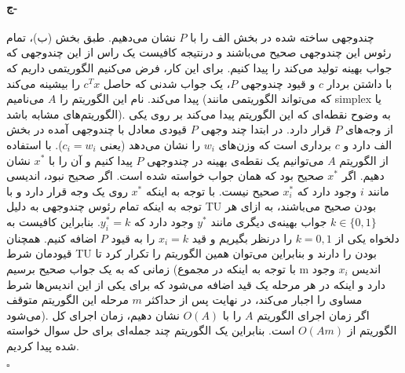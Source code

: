 \documentclass[a4paper,12pt]{article}
\begin{document}
\paragraph{ج-}
چندوجهی ساخته شده در بخش الف را با $P$ نشان می‌دهیم. طبق بخش  (ب)، تمام رئوس این چندوجهی صحیح می‌باشند و درنتیجه کافیست یک راس از این چندوجهی که جواب بهینه تولید می‌کند را پیدا کنیم. برای این کار، فرض می‌کنیم الگوریتمی داریم که با داشتن بردار $c$ و قیود چندوجهی $P$، یک جواب شدنی که حاصل
$c^Tx$
را بیشینه می‌کند پیدا می‌کند. نام این الگوریتم را $A$ می‌نامیم (که می‌تواند الگوریتمی مانند simplex یا الگوریتم‌های مشابه باشد). به وضوح نقطه‌ای که این الگوریتم پیدا می‌کند بر روی یکی از وجه‌های $P$ قرار دارد. در ابتدا چند وجهی $P$ قیودی معادل با چندوجهی آمده در بخش الف دارد و $c$ برداری است که وزن‌های $w_i$ را نشان می‌دهد (یعنی $c_i = w_i$).‌
با استفاده از الگوریتم $A$ می‌توانیم یک نقطه‌ی بهینه در چندوجهی $P$ پیدا کنیم و آن را با $x^*$ نشان دهیم. اگر $x^*$ صحیح بود که همان جواب خواسته شده‌ است. اگر صحیح نبود، اندیسی مانند $i$ وجود دارد که $x^*_i$ صحیح نیست. با توجه به اینکه $x^*$ روی یک وجه قرار دارد و با توجه به اینکه تمام رئوس چندوجهی به دلیل TU بودن صحیح می‌باشند، به ازای هر $k \in \{0,1\}$ جواب بهینه‌ی دیگری مانند $y^*$ وجود دارد که $y^*_i = k$. بنابراین کافیست به دلخواه یکی از $k=0,1$ را درنظر بگیریم و قید
$x_i = k$
را به قیود $P$ اضافه کنیم. همچنان قیودمان شرط TU بودن را دارند و بنابراین می‌توان همین الگوریتم را تکرار کرد تا زمانی که به یک جواب صحیح برسیم (با توجه به اینکه در مجموع m اندیس $x_i$ وجود دارد و اینکه در هر مرحله یک قید اضافه می‌شود که برای یکی از این اندیس‌ها شرط مساوی را اجبار می‌کند، در نهایت پس از حداکثر $m$ مرحله این الگوریتم متوقف می‌شود). اگر زمان اجرای الگوریتم $A$ را با $O(A)$ نشان دهیم، زمان اجرای کل الگوریتم از $O(Am)$ است. بنابراین یک الگوریتم چند جمله‌ای برای حل سوال خواسته شده پیدا کردیم.
\begin{latin}
	$\square$
\end{latin}
\end{document}
